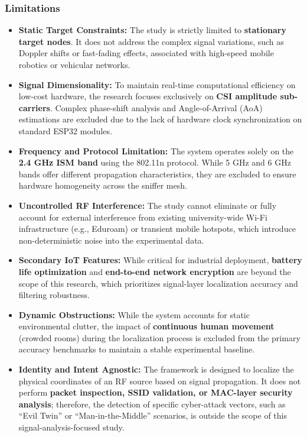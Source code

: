 \subsubsection{Limitations}
\begin{itemize}
    \item \textbf{Static Target Constraints:} The study is strictly limited to \textbf{stationary target nodes}. It does not address the complex signal variations, such as Doppler shifts or fast-fading effects, associated with high-speed mobile robotics or vehicular networks.\smallskip
    \item \textbf{Signal Dimensionality:} To maintain real-time computational efficiency on low-cost hardware, the research focuses exclusively on \textbf{CSI amplitude sub-carriers}. Complex phase-shift analysis and Angle-of-Arrival (AoA) estimations are excluded due to the lack of hardware clock synchronization on standard ESP32 modules.\smallskip
    \item \textbf{Frequency and Protocol Limitation:} The system operates solely on the \textbf{2.4 GHz ISM band} using the 802.11n protocol. While 5 GHz and 6 GHz bands offer different propagation characteristics, they are excluded to ensure hardware homogeneity across the sniffer mesh.\smallskip
    \item \textbf{Uncontrolled RF Interference:} The study cannot eliminate or fully account for external interference from existing university-wide Wi-Fi infrastructure (e.g., Eduroam) or transient mobile hotspots, which introduce non-deterministic noise into the experimental data.\smallskip
    \item \textbf{Secondary IoT Features:} While critical for industrial deployment, \textbf{battery life optimization} and \textbf{end-to-end network encryption} are beyond the scope of this research, which prioritizes signal-layer localization accuracy and filtering robustness.\smallskip
    \item \textbf{Dynamic Obstructions:} While the system accounts for static environmental clutter, the impact of \textbf{continuous human movement} (crowded rooms) during the localization process is excluded from the primary accuracy benchmarks to maintain a stable experimental baseline.\smallskip
    \item \textbf{Identity and Intent Agnostic:} The framework is designed to localize the physical coordinates of an RF source based on signal propagation. It does not perform \textbf{packet inspection, SSID validation, or MAC-layer security analysis}; therefore, the detection of specific cyber-attack vectors, such as ``Evil Twin'' or ``Man-in-the-Middle'' scenarios, is outside the scope of this signal-analysis-focused study.\smallskip
\end{itemize}
